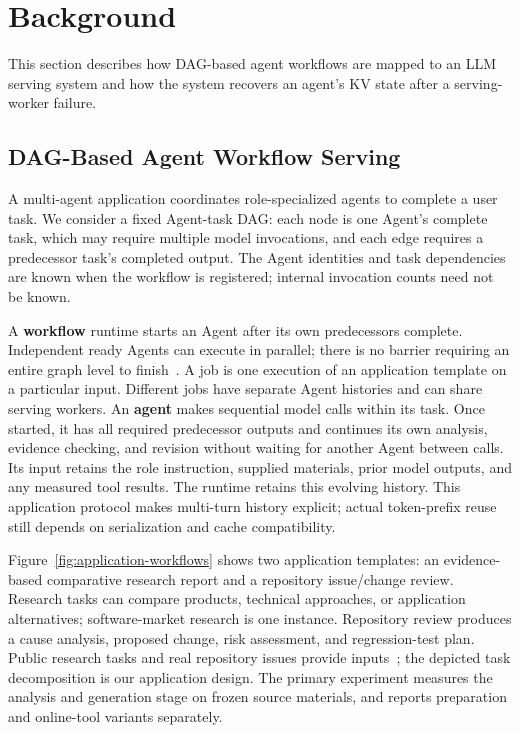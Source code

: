 \section{Background} \label{sec:background} 

This section describes how DAG-based agent workflows are mapped to an LLM serving system and how the system recovers an agent's KV state after a serving-worker failure.

\subsection{DAG-Based Agent Workflow Serving} \label{sec:background:serving} 

A multi-agent application coordinates role-specialized agents to complete a user task. We consider a fixed Agent-task DAG: each node is one Agent's complete task, which may require multiple model invocations, and each edge requires a predecessor task's completed output. The Agent identities and task dependencies are known when the workflow is registered; internal invocation counts need not be known.

A \textbf{workflow} runtime starts an Agent after its own predecessors complete. Independent ready Agents can execute in parallel; there is no barrier requiring an entire graph level to finish~\cite{lin2024parrot}. A job is one execution of an application template on a particular input. Different jobs have separate Agent histories and can share serving workers.
%
An \textbf{agent} makes sequential model calls within its task. Once started, it has all required predecessor outputs and continues its own analysis, evidence checking, and revision without waiting for another Agent between calls. Its input retains the role instruction, supplied materials, prior model outputs, and any measured tool results. The runtime retains this evolving history. This application protocol makes multi-turn history explicit; actual token-prefix reuse still depends on serialization and cache compatibility.

Figure~\ref{fig:application-workflows} shows two application templates: an evidence-based comparative research report and a repository issue/change review. Research tasks can compare products, technical approaches, or application alternatives; software-market research is one instance. Repository review produces a cause analysis, proposed change, risk assessment, and regression-test plan. Public research tasks and real repository issues provide inputs~\cite{du2025deepresearch,li2026deepresearchii,swebenchverified}; the depicted task decomposition is our application design. The primary experiment measures the analysis and generation stage on frozen source materials, and reports preparation and online-tool variants separately.

